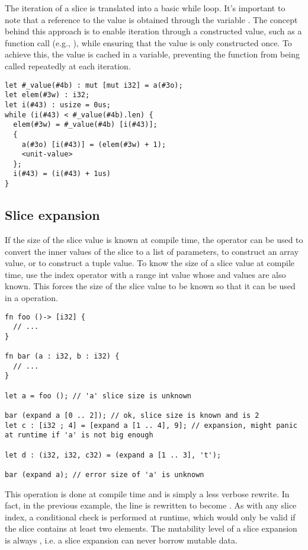 The iteration of a slice is translated into a basic while loop. It's important
to note that a reference to the value is obtained through the variable
. The concept behind this approach is to enable iteration
through a constructed value, such as a function call (e.g., ), while ensuring that the value is only constructed once. To achieve
this, the value is cached in a variable, preventing the function from being
called repeatedly at each iteration.

\begin{lstlisting}[style=intermediateVerb]
let #_value(#4b) : mut [mut i32] = a(#3o);
let elem(#3w) : i32;
let i(#43) : usize = 0us;
while (i(#43) < #_value(#4b).len) {
  elem(#3w) = #_value(#4b) [i(#43)];
  {
    a(#3o) [i(#43)] = (elem(#3w) + 1);
    <unit-value>
  };
  i(#43) = (i(#43) + 1us)
}
\end{lstlisting}

\subsection{Slice expansion}
\label{sec:slice_expansion}

If the size of the slice value is known at compile time, the 
operator can be used to convert the inner values of the slice to a list of
parameters, to construct an array value, or to construct a tuple value. To know
the size of a slice value at compile time, use the index operator with a range
int value whose  and  values are also known. This forces
the size of the slice value to be known so that it can be used in a
 operation.

\begin{lstlisting}[style=coloredverbatim]
fn foo ()-> [i32] {
  // ...
}

fn bar (a : i32, b : i32) {
  // ...
}

let a = foo (); // 'a' slice size is unknown

bar (expand a [0 .. 2]); // ok, slice size is known and is 2
let c : [i32 ; 4] = [expand a [1 .. 4], 9]; // expansion, might panic at runtime if 'a' is not big enough

let d : (i32, i32, c32) = (expand a [1 .. 3], 't');

bar (expand a); // error size of 'a' is unknown
  \end{lstlisting}

This operation is done at compile time and is simply a less verbose rewrite. In
fact, in the previous example, the line  is
rewritten to become . As with any slice index, a
conditional check is performed at runtime, which would only be valid if the
slice  contains at least two elements. The mutability level of a slice
expansion is always , i.e. a slice expansion can never borrow mutable
data.


